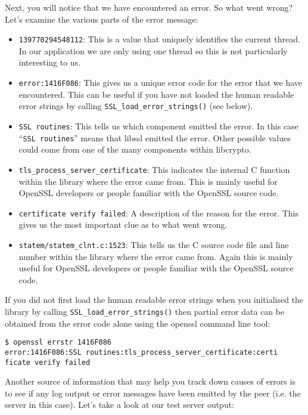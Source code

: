 Next, you will notice that we have encountered an error. So what went wrong? 
Let's examine the various parts of the error message:
\begin{itemize}
\item \texttt{139770294548112}: This is a value that uniquely identifies the
current thread. In our application we are only using one thread so this is not 
particularly interesting to us.
\item \texttt{error:1416F086}: This gives us a unique error code for the error
that we have encountered. This can be useful if you have not loaded the human
readable error strings by calling \texttt{SSL\_load\_error\_strings()} (see
below).
\item \texttt{SSL routines}: This tells us which component emitted the error. In
this case ``\texttt{SSL routines}'' means that libssl emitted the error. Other
possible values could come from one of the many components within libcrypto.
\item \texttt{tls\_process\_server\_certificate}: This indicates the internal C
function within the library where the error came from. This is mainly useful for
OpenSSL developers or people familiar with the OpenSSL source code.
\item \texttt{certificate verify failed}: A description of the reason for the
error. This gives us the most important clue as to what went wrong.
\item \texttt{statem/statem\_clnt.c:1523}: This tells us the C source code file 
and line number within the library where the error came from. Again this is
mainly  useful for OpenSSL developers or people familiar with the OpenSSL
source code.
\end{itemize}

If you did not first load the human readable error strings when you initialised 
the library by calling \verb!SSL_load_error_strings()! then partial error data
can be obtained from the error code alone using the openssl command line tool:

\begin{verbatim}
$ openssl errstr 1416F086
error:1416F086:SSL routines:tls_process_server_certificate:certi
ficate verify failed
\end{verbatim}

Another source of information that may help you track down causes of errors is 
to see if any log output or error messages have been emitted by the peer (i.e. 
the server in this case). Let's take a look at our test server output:

